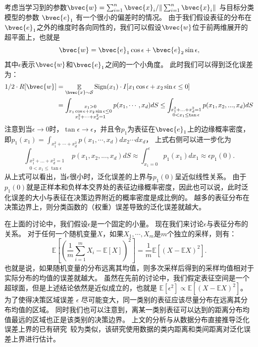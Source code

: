 考虑当学习到的参数$\bvec{w} = \sum_{i=1}^n \bvec{x}_i / \Vert \sum_{i=1}^n \bvec{x}_i \Vert$ 与目标分类模型的参数 $\bvec{e}_1$ 有一个很小的偏差时的情况。
%
由于我们假设表征的分布在$\bvec{e}_1$之外的维度时各向同性的，我们可以假设$\bvec{w}$位于前两维展开的超平面上，也就是
\begin{equation}
    \bvec{w} = \bvec{e}_1 \cos \epsilon + \bvec{e}_2 \sin \epsilon,    
\end{equation}
其中$\epsilon$表示$\bvec{w}$和$\bvec{e}_1$之间的一个小角度。
%
此时我们可以得到泛化误差为：
\begin{equation}
\begin{split}
    1/2\cdot R[\bvec{w}] &= \mathop{\mathbb E}_{\bvec{x} \sim \mathcal S} \text{Sign}(x_1) \cdot I[x_1 \cos \epsilon + x_2 \sin \epsilon \le 0]
    \\
    & = \int_{\substack{x_1 > 0 \\ x_1 \cos \epsilon + x_2 \sin \epsilon \le 0 \\ x_1^2 + \cdots + x_d^2 = 1}} p(x_1, \cdots, x_d)dS
      \le \int_{\substack{x_1^2 + ... + x_d^2 = 1 \\0 < x_1 \le \tan\epsilon}}p(x_1, x_2, ...,x_d)dS
\end{split}
\end{equation}
注意到当$\epsilon \to 0$时，$\tan \epsilon \to \epsilon$，并且令$p_1$为表征在$\bvec{e}_1$上的边缘概率密度，即$p_1(x_1) = \int_{x_1^2 + \cdots + x_d^2} p(x_1, \cdots, x_d) dx_2\cdots dx_d$，
%
上式右侧可以进一步化为
\begin{equation}
    \int_{\substack{x_1^2 + ... + x_d^2 = 1 \\0 < x_1 \le \tan\epsilon}}p(x_1, x_2, ...,x_d)dS \approx \int_{x_1 = 0}^{\epsilon} p_1(x_1) dx_1 \approx \epsilon p_1(0).
\end{equation}
%
从上式可以看出，当$\epsilon$很小时，泛化误差的上界与$p_1(0)$呈近似线性关系。
由于$p_1(0)$就是正样本和负样本交界处的表征边缘概率密度，因此也可以说，此时泛化误差的大小与表征在决策边界附近的概率密度是成比例的。
越多的表征分布在决策边界上，则分类函数的（权重）误差导致的泛化误差就越大。

在上面的讨论中，我们假设$\epsilon$是一个固定的小量。
%
现在我们来讨论$\epsilon$与表征分布的关系。
%
对于任何一个随机变量$X$，如果$X_1, \cdots, X_m$是$m$个独立的采样，则有：
\begin{equation}
    \mathbb E \left[ \left(\dfrac{1}{m}\sum_{i=1}^m X_i - \mathbb E[X] \right)^2 \right] = \dfrac{1}{m} \mathbb E\left[\left(X -\mathbb EX\right)^2 \right].
\end{equation}
%
也就是说，如果随机变量的分布远离其均值，则多次采样后得到的采样均值相对于实际分布的均值的误差就越大。
%
虽然在先前的讨论中，我们假定表征空间是一个超球面，但是上述结论依然是近似成立的，也就是 $\mathbb E[\epsilon^2]\propto \mathbb E\left[(X - \mathbb EX)^2\right]$。
为了使得决策区域误差 $\epsilon$ 尽可能变大，同一类别的表征应该尽量分布在远离其分布均值的区域。
同时我们也可以注意到，离某一类别表征可以达到的距离分布均值最远的区域也正是该类别的决策边界。
%
上文的分析与从数据分布直接推导泛化误差上界的已有研究~\cite{jinpengzhan2020generalization}较为类似，该研究使用数据的类内距离和类间距离对泛化误差上界进行估计。


